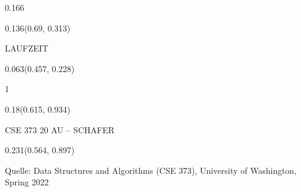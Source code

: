 \documentclass[aspectratio=169]{beamer}
\begin{document}
\begin{frame}[fragile]
\begin{textblock}{0.166}
\end{textblock}
\begin{textblock}{0.136}(0.69, 0.313)
  \begin{minipage}[t][0.161\paperheight]{\linewidth}
    \tiny
    LAUFZEIT\nFUNKTION
  \end{minipage}
\end{textblock}
\begin{textblock}{0.063}(0.457, 0.228)
  \begin{minipage}[t][0.111\paperheight]{\linewidth}
    \tiny
    1
  \end{minipage}
\end{textblock}
\begin{textblock}{0.18}(0.615, 0.934)
  \begin{minipage}[b][0.032\paperheight]{\linewidth}
    \raggedright
    \fontsize{3}{3.3}\selectfont
    CSE 373 20 AU – SCHAFER
  \end{minipage}
\end{textblock}
\begin{textblock}{0.231}(0.564, 0.897)
  \begin{minipage}[b][0.032\paperheight]{\linewidth}
    \raggedright
    \fontsize{3}{3.3}\selectfont
    Quelle: Data Structures and Algorithms (CSE 373), University of Washington, Spring 2022
  \end{minipage}
\end{textblock}
\end{frame}
\end{document}
